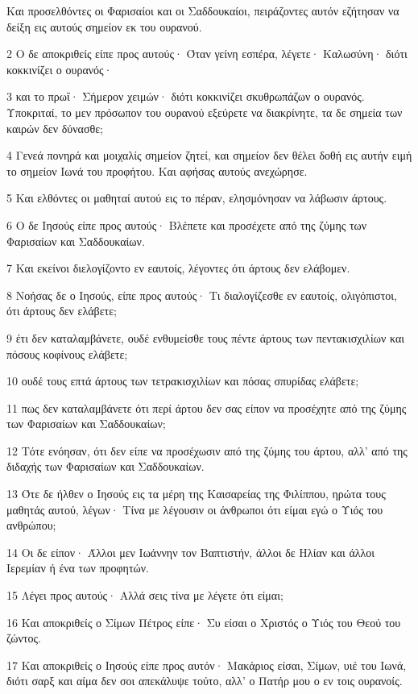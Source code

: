\par Και προσελθόντες οι Φαρισαίοι και οι Σαδδουκαίοι, πειράζοντες αυτόν εζήτησαν να δείξη εις αυτούς σημείον εκ του ουρανού.
\par 2 Ο δε αποκριθείς είπε προς αυτούς· Όταν γείνη εσπέρα, λέγετε· Καλωσύνη· διότι κοκκινίζει ο ουρανός·
\par 3 και το πρωΐ· Σήμερον χειμών· διότι κοκκινίζει σκυθρωπάζων ο ουρανός. Υποκριταί, το μεν πρόσωπον του ουρανού εξεύρετε να διακρίνητε, τα δε σημεία των καιρών δεν δύνασθε;
\par 4 Γενεά πονηρά και μοιχαλίς σημείον ζητεί, και σημείον δεν θέλει δοθή εις αυτήν ειμή το σημείον Ιωνά του προφήτου. Και αφήσας αυτούς ανεχώρησε.
\par 5 Και ελθόντες οι μαθηταί αυτού εις το πέραν, ελησμόνησαν να λάβωσιν άρτους.
\par 6 Ο δε Ιησούς είπε προς αυτούς· Βλέπετε και προσέχετε από της ζύμης των Φαρισαίων και Σαδδουκαίων.
\par 7 Και εκείνοι διελογίζοντο εν εαυτοίς, λέγοντες ότι άρτους δεν ελάβομεν.
\par 8 Νοήσας δε ο Ιησούς, είπε προς αυτούς· Τι διαλογίζεσθε εν εαυτοίς, ολιγόπιστοι, ότι άρτους δεν ελάβετε;
\par 9 έτι δεν καταλαμβάνετε, ουδέ ενθυμείσθε τους πέντε άρτους των πεντακισχιλίων και πόσους κοφίνους ελάβετε;
\par 10 ουδέ τους επτά άρτους των τετρακισχιλίων και πόσας σπυρίδας ελάβετε;
\par 11 πως δεν καταλαμβάνετε ότι περί άρτου δεν σας είπον να προσέχητε από της ζύμης των Φαρισαίων και Σαδδουκαίων;
\par 12 Τότε ενόησαν, ότι δεν είπε να προσέχωσιν από της ζύμης του άρτου, αλλ' από της διδαχής των Φαρισαίων και Σαδδουκαίων.
\par 13 Ότε δε ήλθεν ο Ιησούς εις τα μέρη της Καισαρείας της Φιλίππου, ηρώτα τους μαθητάς αυτού, λέγων· Τίνα με λέγουσιν οι άνθρωποι ότι είμαι εγώ ο Υιός του ανθρώπου;
\par 14 Οι δε είπον· Άλλοι μεν Ιωάννην τον Βαπτιστήν, άλλοι δε Ηλίαν και άλλοι Ιερεμίαν ή ένα των προφητών.
\par 15 Λέγει προς αυτούς· Αλλά σεις τίνα με λέγετε ότι είμαι;
\par 16 Και αποκριθείς ο Σίμων Πέτρος είπε· Συ είσαι ο Χριστός ο Υιός του Θεού του ζώντος.
\par 17 Και αποκριθείς ο Ιησούς είπε προς αυτόν· Μακάριος είσαι, Σίμων, υιέ του Ιωνά, διότι σαρξ και αίμα δεν σοι απεκάλυψε τούτο, αλλ' ο Πατήρ μου ο εν τοις ουρανοίς.
